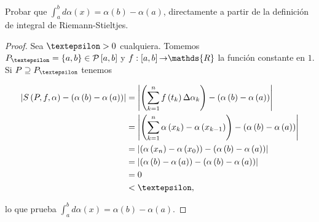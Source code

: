 \setcounter{section}{7}
\setcounter{exercise}{0}

\begin{exercise}
  Probar que $\int_{a}^{b}d\alpha\left(x\right)=\alpha\left(b\right)-\alpha\left(a\right)$, directamente a partir de la definición de integral de Riemann-Stieltjes.
\end{exercise}

\begin{proof}

Sea $\text{\textepsilon}>0$ cualquiera. Tomemos $P_{\text{\textepsilon}}=\left\lbrace a,b\right\rbrace\in\mathcal{P}\left[a,b\right]$ y $f:\left[a,b\right]\text{\textrightarrow}\mathds{R}$ la función constante en $1$. Si $P\supseteq P_{\text{\textepsilon}}$ tenemos

\begin{align*}
  \left| S\left(P,f,\alpha\right)-\left(\alpha\left(b\right)-\alpha\left(a\right)\right)\right|&=\left|\left(\sum_{k=1}^{n}f\left(t_k\right)\Delta\alpha_k\right)-\left(\alpha\left(b\right)-\alpha\left(a\right)\right) \right|\\
  &=\left|\left(\sum_{k=1}^{n} \alpha\left(x_k\right)-\alpha\left(x_{k-1}\right)\right)-\left(\alpha\left(b\right)-\alpha\left(a\right)\right)\right|\\
  &=\left|\left(\alpha\left(x_n\right)-\alpha\left(x_0\right)\right)-\left(\alpha\left(b\right)-\alpha\left(a\right)\right)\right|\\
  &=\left|\left(\alpha\left(b\right)-\alpha\left(a\right)\right)-\left(\alpha\left(b\right)-\alpha\left(a\right)\right)\right|\\
  &=0\\
  &<\text{\textepsilon},
\end{align*}

lo que prueba $\int_{a}^{b}d\alpha\left(x\right)=\alpha\left(b\right)-\alpha\left(a\right)$.
  
\end{proof}

